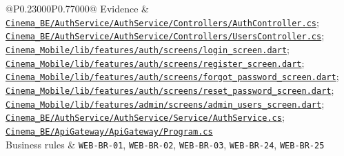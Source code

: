 \begin{longtable}{@{}P{0.23000\SRSWidth}P{0.77000\SRSWidth}@{}}
Evidence & \href{../../../Cinema\_BE/AuthService/AuthService/Controllers/AuthController.cs}{\texttt{Cinema\_\allowbreak{}BE/\allowbreak{}Auth\allowbreak{}Service/\allowbreak{}Auth\allowbreak{}Service/\allowbreak{}Controll\allowbreak{}ers/\allowbreak{}Auth\allowbreak{}Controll\allowbreak{}er.\allowbreak{}cs}}; \href{../../../Cinema\_BE/AuthService/AuthService/Controllers/UsersController.cs}{\texttt{Cinema\_\allowbreak{}BE/\allowbreak{}Auth\allowbreak{}Service/\allowbreak{}Auth\allowbreak{}Service/\allowbreak{}Controll\allowbreak{}ers/\allowbreak{}Users\allowbreak{}Controll\allowbreak{}er.\allowbreak{}cs}}; \href{../../../Cinema\_Mobile/lib/features/auth/screens/login\_screen.dart}{\texttt{Cinema\_\allowbreak{}Mobile/\allowbreak{}lib/\allowbreak{}features\allowbreak{}/\allowbreak{}auth/\allowbreak{}screens/\allowbreak{}login\_\allowbreak{}screen.\allowbreak{}dart}}; \href{../../../Cinema\_Mobile/lib/features/auth/screens/register\_screen.dart}{\texttt{Cinema\_\allowbreak{}Mobile/\allowbreak{}lib/\allowbreak{}features\allowbreak{}/\allowbreak{}auth/\allowbreak{}screens/\allowbreak{}register\allowbreak{}\_\allowbreak{}screen.\allowbreak{}dart}}; \href{../../../Cinema\_Mobile/lib/features/auth/screens/forgot\_password\_screen.dart}{\texttt{Cinema\_\allowbreak{}Mobile/\allowbreak{}lib/\allowbreak{}features\allowbreak{}/\allowbreak{}auth/\allowbreak{}screens/\allowbreak{}forgot\_\allowbreak{}password\allowbreak{}\_\allowbreak{}screen.\allowbreak{}dart}}; \href{../../../Cinema\_Mobile/lib/features/auth/screens/reset\_password\_screen.dart}{\texttt{Cinema\_\allowbreak{}Mobile/\allowbreak{}lib/\allowbreak{}features\allowbreak{}/\allowbreak{}auth/\allowbreak{}screens/\allowbreak{}reset\_\allowbreak{}password\allowbreak{}\_\allowbreak{}screen.\allowbreak{}dart}}; \href{../../../Cinema\_Mobile/lib/features/admin/screens/admin\_users\_screen.dart}{\texttt{Cinema\_\allowbreak{}Mobile/\allowbreak{}lib/\allowbreak{}features\allowbreak{}/\allowbreak{}admin/\allowbreak{}screens/\allowbreak{}admin\_\allowbreak{}users\_\allowbreak{}screen.\allowbreak{}dart}}; \href{../../../Cinema\_BE/AuthService/AuthService/Service/AuthService.cs}{\texttt{Cinema\_\allowbreak{}BE/\allowbreak{}Auth\allowbreak{}Service/\allowbreak{}Auth\allowbreak{}Service/\allowbreak{}Service/\allowbreak{}Auth\allowbreak{}Service.\allowbreak{}cs}}; \href{../../../Cinema\_BE/ApiGateway/ApiGateway/Program.cs}{\texttt{Cinema\_\allowbreak{}BE/\allowbreak{}Api\allowbreak{}Gateway/\allowbreak{}Api\allowbreak{}Gateway/\allowbreak{}Program.\allowbreak{}cs}} \\[3pt]
Business rules & \texttt{WEB-\allowbreak{}BR-\allowbreak{}01}, \texttt{WEB-\allowbreak{}BR-\allowbreak{}02}, \texttt{WEB-\allowbreak{}BR-\allowbreak{}03}, \texttt{WEB-\allowbreak{}BR-\allowbreak{}24}, \texttt{WEB-\allowbreak{}BR-\allowbreak{}25} \\[3pt]

\end{longtable}
